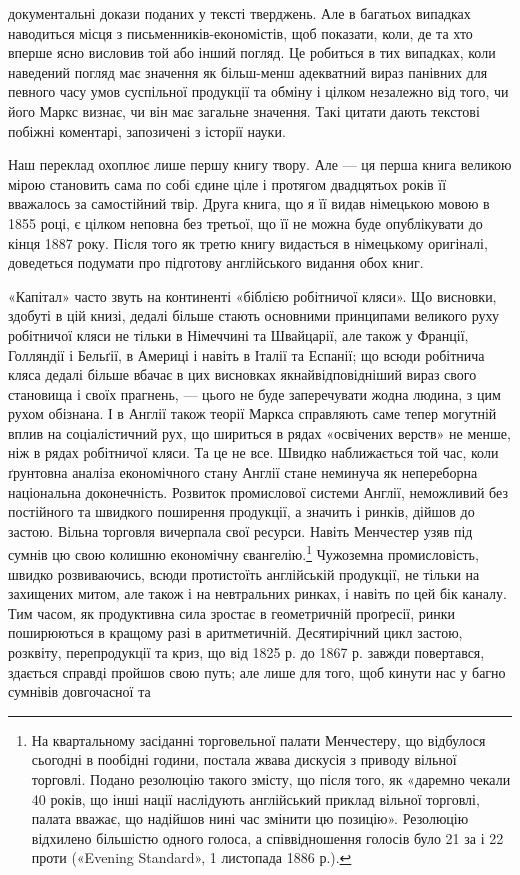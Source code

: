 документальні докази поданих у тексті тверджень. Але в багатьох
випадках наводиться місця з письменників-економістів, щоб показати,
коли, де та хто вперше ясно висловив той або інший
погляд. Це робиться в тих випадках, коли наведений погляд має
значення як більш-менш адекватний вираз панівних для певного
часу умов суспільної продукції та обміну і цілком незалежно від
того, чи його Маркс визнає, чи він має загальне значення. Такі
цитати дають текстові побіжні коментарі, запозичені з історії
науки.

Наш переклад охоплює лише першу книгу твору. Але — ця
перша книга великою мірою становить сама по собі єдине ціле і
протягом двадцятьох років її вважалось за самостійний твір. Друга
книга, що я її видав німецькою мовою в 1855 році, є цілком
неповна без третьої, що її не можна буде опублікувати до кінця
1887 року. Після того як третю книгу видасться в німецькому
оригіналі, доведеться подумати про підготову англійського видання
обох книг.

«Капітал» часто звуть на континенті «біблією робітничої
кляси». Що висновки, здобуті в цій книзі, дедалі більше стають
основними принципами великого руху робітничої кляси не тільки
в Німеччині та Швайцарії, але також у Франції, Голляндії і
Бельґії, в Америці і навіть в Італії та Еспанії; що всюди робітнича
кляса дедалі більше вбачає в цих висновках якнайвідповідніший
вираз свого становища і своїх прагнень, — цього не буде
заперечувати жодна людина, з цим рухом обізнана. І в Англії також
теорії Маркса справляють саме тепер могутній вплив на соціалістичний
рух, що шириться в рядах «освічених верств» не менше,
ніж в рядах робітничої кляси. Та це не все. Швидко наближається
той час, коли ґрунтовна аналіза економічного стану Англії стане
неминуча як непереборна національна доконечність. Розвиток
промислової системи Англії, неможливий без постійного та швидкого
поширення продукції, а значить і ринків, дійшов до застою.
Вільна торговля вичерпала свої ресурси. Навіть Менчестер узяв
під сумнів цю свою колишню економічну євангелію.\footnote{
На квартальному засіданні торговельної палати Менчестеру, що
відбулося сьогодні в пообідні години, постала жвава дискусія з приводу
вільної торговлі. Подано резолюцію такого змісту, що після того, як
«даремно чекали 40 років, що інші нації наслідують англійський приклад
вільної торговлі, палата вважає, що надійшов нині час змінити цю позицію».
Резолюцію відхилено більшістю одного голоса, а співвідношення
голосів було 21 за і 22 проти («Evening Standard», 1 листопада 1886 р.).
} Чужоземна
промисловість, швидко розвиваючись, всюди протистоїть англійській
продукції, не тільки на захищених митом, але також і на
невтральних ринках, і навіть по цей бік каналу. Тим часом, як
продуктивна сила зростає в геометричній проґресії, ринки поширюються
в кращому разі в аритметичній. Десятирічний цикл
застою, розквіту, перепродукції та криз, що від 1825 р. до 1867 р.
завжди повертався, здається справді пройшов свою путь; але
лише для того, щоб кинути нас у багно сумнівів довгочасної та